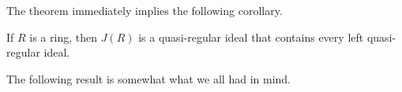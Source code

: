 The theorem immediately implies the following corollary. 

\begin{corollary}
	If $R$ is a ring, then $J(R)$ is a quasi-regular ideal that contains every 
	left quasi-regular ideal. 
\end{corollary}

The following result is somewhat what we all had in mind. 


%
%	

%

